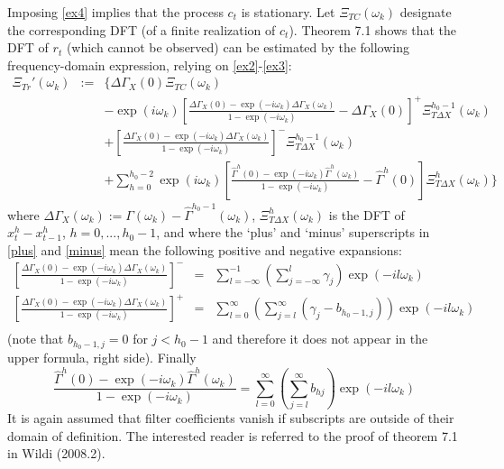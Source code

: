 \documentclass[11pt]{article}
\begin{document}
Imposing \ref{ex4} implies that the process $c_t$ is stationary. Let $\Xi_{TC}(\omega_k)$ designate the corresponding DFT (of a finite realization of $c_t$). Theorem 7.1 shows that the DFT of $r_t$ (which cannot be observed) can be estimated by the following frequency-domain expression, relying on \ref{ex2}-\ref{ex3}:
\begin{eqnarray}
\Xi_{Tr}'(\omega_k)&:=& \Bigg\{\Delta{\Gamma}_X(0) \Xi_{TC}(\omega_k)\label{xi}\\
&&-\exp(i\omega_k)\left[\frac{\Delta{\Gamma}_X(0)-
\exp(-i\omega_k)\Delta{\Gamma}_X(\omega_k)}{1-\exp(-i\omega_k)}-\Delta{\Gamma}_X(0)\right]^+\Xi_{T\Delta X}^{h_0-1}(\omega_k)\label{plus}\\
&&+\left[\frac{\Delta{\Gamma}_X(0)-
\exp(-i\omega_k)\Delta{\Gamma}_X(\omega_k)}{1-\exp(-i\omega_k)}\right]^-\Xi_{T\Delta X}^{h_0-1}(\omega_k)\label{minus}\\
&&+\sum_{h=0}^{h_0-2}\exp(i\omega_k)\left[\frac{\hat{\Gamma}^h(0)-
\exp(-i\omega_k)\hat{\Gamma}^h(\omega_k)}{1-\exp(-i\omega_k)}-\hat{\Gamma}^h(0)\right]\Xi_{T\Delta
X}^h(\omega_k)\Bigg\}\label{pm}
\end{eqnarray}
where $\Delta{\Gamma}_X(\omega_k):=\Gamma(\omega_k)-{\hat{\Gamma}}^{h_0-1}(\omega_k)$, $\Xi_{T\Delta X}^{h}(\omega_k)$ is the DFT of $x_t^h-x_{t-1}^h$, $h=0,...,h_0-1$, and where the `plus' and `minus' superscripts in \ref{plus} and \ref{minus} mean the following positive and negative expansions:
\begin{eqnarray*}
\left[\frac{\Delta{\Gamma}_X(0)-
\exp(-i\omega_k)\Delta{\Gamma}_X(\omega_k)}{1-\exp(-i\omega_k)}\right]^-&=&\sum_{l=-\infty}^{-1}\left(\sum_{j=-\infty}^l{\gamma}_{j}\right)\exp(-il\omega_k)\\
\left[\frac{\Delta{\Gamma}_X(0)-
\exp(-i\omega_k)\Delta{\Gamma}_X(\omega_k)}{1-\exp(-i\omega_k)}\right]^+
&=&\sum_{l=0}^\infty\left(\sum_{j=l}^\infty({\gamma}_{j}-{b}_{h_0-1,j})\right)\exp(-il\omega_k)\\
\end{eqnarray*}
(note that ${b}_{h_0-1,j}=0$ for $j<h_0-1$ and therefore it does not appear in the upper formula, right side). Finally
\[
\frac{\hat{\Gamma}^h(0)-
\exp(-i\omega_k)\hat{\Gamma}^h(\omega_k)}{1-\exp(-i\omega_k)}=\sum_{l=0}^\infty\left(\sum_{j=l}^\infty b_{hj}\right)\exp(-il\omega_k)
\]
It is again assumed that filter coefficients vanish if subscripts are outside of their domain of definition. The interested reader is referred to the proof of theorem 7.1 in Wildi (2008.2).\\
\end{document}
